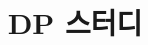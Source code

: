 \documentclass{beamer}
\title{DP 스터디}
\author{}
\date{\number\year년 \number\month월 \number\day일}
\begin{document}
\frame{\titlepage}





\end{document}
